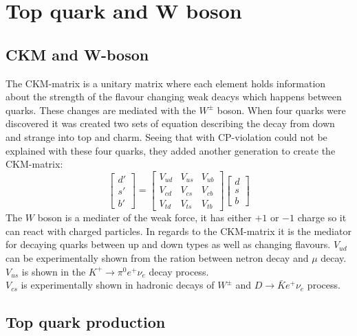 \section{Top quark and W boson}
  \subsection{CKM and W-boson}
	The CKM-matrix is a unitary matrix where each element holds information about the
      	strength of the flavour changing weak deacys which happens between quarks.
      	These changes are mediated with the $W^{\pm}$ boson.
      	When four quarks were discovered it was created two sets of equation describing
      	the decay from down and strange into top and charm.
      	Seeing that with CP-violation could not be explained with these four quarks,
      	they added another generation to create the CKM-matrix:
      	\begin{equation}
      	\begin{bmatrix}
      	  d'\\
      	  s'\\
      	  b'
      	\end{bmatrix}
      	=
      	\begin{bmatrix}
      	  V_{ud} & V_{us} & V_{ub} \\
      	  V_{cd} & V_{cs} & V_{cb} \\
      	  V_{td} & V_{ts} & V_{tb} 
      	\end{bmatrix}
      	\begin{bmatrix}
      	  d\\
      	  s\\
      	  b
      	\end{bmatrix}
      	\end{equation}
      	The $W$ boson is a mediater of the weak force, it has either $+1$ or $-1$ charge so it
	can react with charged particles. In regards to the CKM-matrix it is the mediator for
	decaying quarks between up and down types as well as changing flavours.
	$V_{ud}$ can be experimentally shown from the ration between netron decay and
	$\mu$ decay.\\
	$V_{us}$ is shown in the $K^+ \rightarrow \pi^0 e^+ \nu_e$ decay process.\\
	$V_{cs}$ is experimentally shown in hadronic decays of $W^{\pm}$ and 
	$D\rightarrow \bar{K}e^+\nu_e$ process.
  \subsection{Top quark production}

